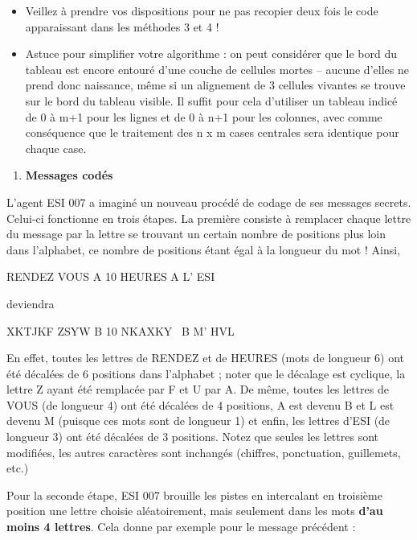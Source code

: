\liststyleListi
\begin{itemize}
\item {
Veillez à prendre vos dispositions pour ne pas recopier deux fois le
code apparaissant dans les méthodes 3 et 4 !}
\item {
{Astuce pour simplifier votre
algorithme}{ : on peut considérer que le bord
du tableau est encore entouré d’une couche de cellules mortes – aucune
d’elles ne prend donc naissance, même si un alignement de 3 cellules
vivantes se trouve sur le bord du tableau visible. Il suffit pour cela
d’utiliser un tableau indicé de 0 à m+1 pour les lignes et de 0 à n+1
pour les colonnes, avec comme conséquence que le traitement des n x m
cases centrales sera identique pour chaque case.}}
\end{itemize}
\liststyleExercice
\begin{enumerate}
\item {\sffamily\bfseries
Messages codés}
\end{enumerate}
{
L'agent ESI 007 a imaginé un nouveau procédé de codage
de ses messages secrets. Celui-ci fonctionne en trois étapes. La
première consiste à remplacer chaque lettre du message par la lettre se
trouvant un certain nombre de positions plus loin dans l’alphabet, ce
nombre de positions étant égal à la longueur du mot ! Ainsi,}

{\centering
RENDEZ VOUS A 10 HEURES A L’ ESI
\par}

{
deviendra}

{\centering
XKTJKF ZSYW B 10 NKAXKY \ B M’ HVL
\par}

{
En effet, toutes les lettres de RENDEZ et de HEURES (mots de longueur 6)
ont été décalées de 6 positions dans l’alphabet ; noter que le décalage
est cyclique, la lettre Z ayant été remplacée par F et U par A. De
même, toutes les lettres de VOUS (de longueur 4) ont été décalées de 4
positions, A est devenu B et L est devenu M (puisque ces mots sont de
longueur 1) et enfin, les lettres d’ESI (de longueur 3) ont été
décalées de 3 positions. Notez que seules les lettres sont modifiées,
les autres caractères sont inchangés (chiffres, ponctuation,
guillemets, etc.)}

{
Pour la seconde étape, ESI 007 brouille les pistes en intercalant en
troisième position une lettre choisie aléatoirement, mais seulement
dans les mots \textbf{d’au moins 4 lettres}. Cela donne par exemple
pour le message précédent :}

